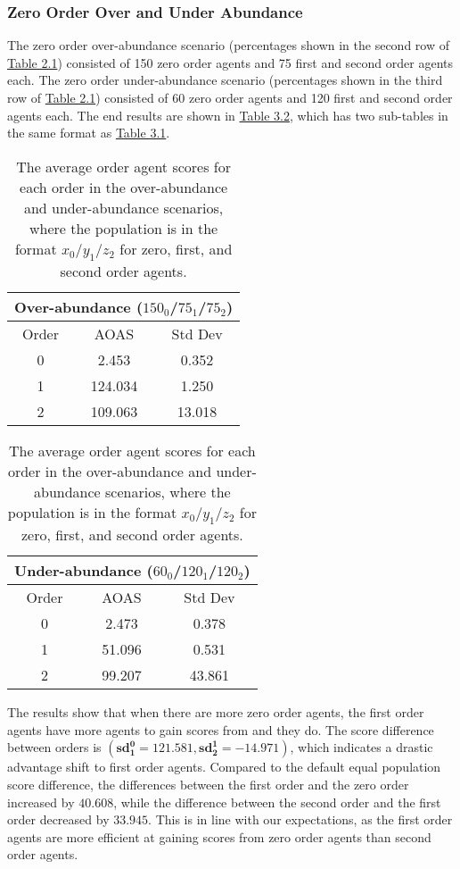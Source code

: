 \subsubsection{Zero Order Over and Under Abundance}

The zero order over-abundance scenario (percentages shown in the second row of \hyperref[tab:reg-population-table]{Table 2.1}) consisted of 150 zero order agents and 75 first and second order agents each. The zero order under-abundance scenario (percentages shown in the third row of \hyperref[tab:reg-population-table]{Table 2.1}) consisted of 60 zero order agents and 120 first and second order agents each. The end results are shown in \hyperref[table:non-sig-zero-order-simple]{Table 3.2}, which has two sub-tables in the same format as \hyperref[table:non-sig-default-equal-simple]{Table 3.1}.

\begin{table}[h]
\centering
\begin{tabular}{|c|c|c|}
\hline
\multicolumn{3}{|c|}{Over-abundance ($150_{0}$/$75_{1}$/$75_{2}$)} \\
\hline
Order & AOAS & Std Dev \\
\hline
0     & 2.453   & 0.352   \\
1     & 124.034 & 1.250   \\
2     & 109.063 & 13.018  \\
\hline
\end{tabular}
\qquad
\begin{tabular}{|c|c|c|}
\hline
\multicolumn{3}{|c|}{Under-abundance ($60_{0}$/$120_{1}$/$120_{2}$)} \\
\hline
Order & AOAS & Std Dev \\
\hline
0     & 2.473   & 0.378   \\
1     & 51.096  & 0.531   \\
2     & 99.207  & 43.861  \\
\hline
\end{tabular}
\caption{The average order agent scores for each order in the over-abundance and under-abundance scenarios, where the population is in the format $x_{0}$/$y_{1}$/$z_{2}$ for zero, first, and second order agents.}
\label{table:non-sig-zero-order-simple}
\end{table}

The results show that when there are more zero order agents, the first order agents have more agents to gain scores from and they do. The score difference between orders is $(\mathbf{sd^0_1 = 121.581}, \mathbf{sd^1_2 = -14.971})$, which indicates a drastic advantage shift to first order agents. Compared to the default equal population score difference, the differences between the first order and the zero order increased by $\mathbf{40.608}$, while the difference between the second order and the first order decreased by $\mathbf{33.945}$. This is in line with our expectations, as the first order agents are more efficient at gaining scores from zero order agents than second order agents. 

